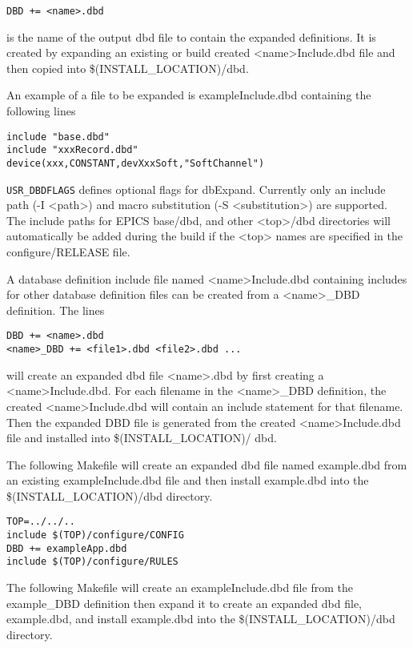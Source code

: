 \begin{verbatim}DBD += <name>.dbd
\end{verbatim}is the name of the output dbd file to contain the expanded definitions. It is created by expanding an existing or build          
created \textless{}name\textgreater{}Include.dbd file and then copied into \$(INSTALL\_LOCATION)/dbd.

An example of a file to be expanded is exampleInclude.dbd containing the following lines

\begin{verbatim}include "base.dbd"
include "xxxRecord.dbd"
device(xxx,CONSTANT,devXxxSoft,"SoftChannel")
\end{verbatim}\verb|USR_DBDFLAGS| defines optional flags for dbExpand. Currently only an include path (-I \textless{}path\textgreater{}) and macro substitution 
(-S \textless{}substitution\textgreater{}) are supported. The include paths for EPICS base/dbd, and other \textless{}top\textgreater{}/dbd directories will 
automatically be added during the build if the \textless{}top\textgreater{} names are specified in the configure/RELEASE file.

A database definition include file named  \textless{}name\textgreater{}Include.dbd containing includes for other database definition files can 
be created from a \textless{}name\textgreater{}\_DBD definition. The lines

\begin{verbatim}DBD += <name>.dbd
<name>_DBD += <file1>.dbd <file2>.dbd ...
\end{verbatim}will create an expanded dbd file \textless{}name\textgreater{}.dbd by first creating a \textless{}name\textgreater{}Include.dbd. For each filename in the 
\textless{}name\textgreater{}\_DBD definition, the created \textless{}name\textgreater{}Include.dbd will contain an include statement for that filename. Then   the 
expanded DBD file is generated from the created \textless{}name\textgreater{}Include.dbd file and installed into \$(INSTALL\_LOCATION)/
dbd. 

The following Makefile will create an expanded dbd file named example.dbd from an existing exampleInclude.dbd file 
and then install example.dbd into the \$(INSTALL\_LOCATION)/dbd directory.

\begin{verbatim}TOP=../../..
include $(TOP)/configure/CONFIG
DBD += exampleApp.dbd
include $(TOP)/configure/RULES
\end{verbatim}The following Makefile will create an exampleInclude.dbd file from the example\_DBD definition then expand it to create 
an expanded dbd file, example.dbd, and install example.dbd into the \$(INSTALL\_LOCATION)/dbd directory.

